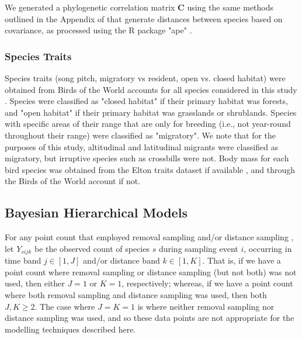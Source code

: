 \documentclass[12pt]{article}
\begin{document}
\par We generated a phylogenetic correlation matrix $\mathbf{C}$ using the same methods outlined in the Appendix of \citet{solymos_phylogeny_2018} that generate distances between species based on covariance, as processed using the R package "ape" \citep{paradis_ape_2019}.

\subsubsection{Species Traits}
\par Species traits (song pitch, migratory vs resident, open vs. closed habitat) were obtained from Birds of the World accounts for all species considered in this study \citep{billerman_birds_2022}. 
Species were classified as "closed habitat" if their primary habitat was forests, and "open habitat" if their primary habitat was grasslands or shrublands.
Species with specific areas of their range that are only for breeding (i.e., not year-round throughout their range) were classified as "migratory".
We note that for the purposes of this study, altitudinal and latitudinal migrants were classified as migratory, but irruptive species such as crossbills were not.
Body mass for each bird species was obtained from the Elton traits dataset if available \citep{wilman_eltontraits_2014}, and through the Birds of the World account \citep{billerman_birds_2022} if not.

\subsection{Bayesian Hierarchical Models}

\par For any point count that employed removal sampling \citep{alldredge_time--detection_2007, farnsworth_removal_2002} and/or distance sampling \citep{buckland_introduction_2001, buckland_distance_2015}, let $Y_{sijk}$ be the observed count of species $s$ during sampling event $i$, occurring in time band $j \in [1,J]$ and/or distance band $k \in [1,K]$.
That is, if we have a point count where removal sampling or distance sampling (but not both) was not used, then either $J = 1$ or $K = 1$, respectively; whereas, if we have a point count where both removal sampling and distance sampling was used, then both $J,K \geq 2$.
The case where $J = K = 1$ is where neither removal sampling nor distance sampling was used, and so these data points are not appropriate for the modelling techniques described here.
\end{document}
